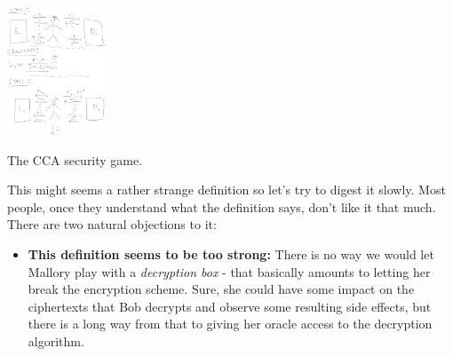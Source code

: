 \hypertarget{CCAdef}{}


\begin{marginfigure}
\centering
\includegraphics[width=\linewidth, height=1.5in, keepaspectratio]{../figure/cca-game.jpg}
\caption{The CCA security game.}
\label{CCAgamefig}
\end{marginfigure}

This might seems a rather strange definition so let's try to digest it
slowly. Most people, once they understand what the definition says,
don't like it that much. There are two natural objections to it:

\begin{itemize}
\tightlist
\item
  \textbf{This definition seems to be too strong:} There is no way we
  would let Mallory play with a \emph{decryption box} - that basically
  amounts to letting her break the encryption scheme. Sure, she could
  have some impact on the ciphertexts that Bob decrypts and observe some
  resulting side effects, but there is a long way from that to giving
  her oracle access to the decryption algorithm.
\end{itemize}

